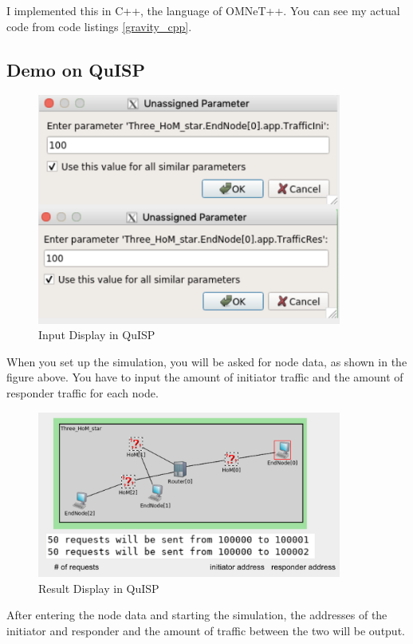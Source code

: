 I implemented this in C++, the language of OMNeT++. 
You can see my actual code from code listings \ref{gravity_cpp}.

\subsection{Demo on QuISP}
\begin{figure}[H]
  \centering
  \includegraphics[width=10cm]{img/QuISP_input.png}
  \caption{Input Display in QuISP}
  \label{fig:QuISP_input} 
\end{figure}
When you set up the simulation, you will be asked for node data, as shown in the figure above.
You have to input the amount of initiator traffic and the amount of responder traffic for each node.
\begin{figure}[H]
  \centering
  \includegraphics[width=10cm]{img/QuISP_result.png}
  \caption{Result Display in QuISP}
  \label{fig:QuISP_result} 
\end{figure}
After entering the node data and starting the simulation, the addresses of the initiator and responder and the amount of traffic between the two will be output.

